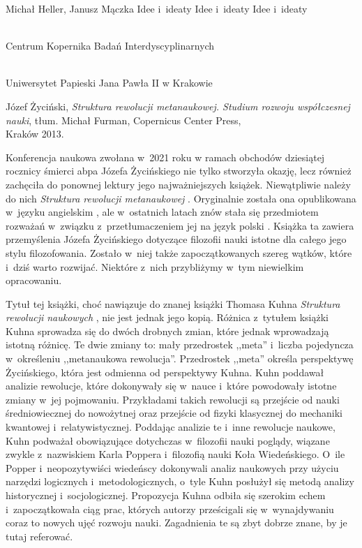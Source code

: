 \begin{newrevplenv2auth}{Michał Heller, Janusz Mączka}
	{Idee i~ideaty}
	{Idee i~ideaty}
	{Idee i~ideaty}
	{\flushright{}\\\subsubsectit\small{Centrum Kopernika Badań Interdyscyplinarnych}\par
	\flushright{}\\\subsubsectit\small{Uniwersytet Papieski Jana Pawła II w Krakowie}\par}
	{Józef Życiński, \textit{Struktura rewolucji metanaukowej. Studium rozwoju współczesnej nauki}, tłum. Michał Furman, Copernicus Center Press,
	\\Kraków 2013.}




\lettrine[loversize=0.13,lines=2,lraise=-0.01,nindent=0em,findent=0.2pt]%
{K}{}onferencja naukowa zwołana w~2021 roku w ramach obchodów dziesiątej rocznicy śmierci abpa Józefa Życińskiego nie tylko stworzyła okazję, lecz również zachęciła do ponownej lektury jego najważniejszych książek. Niewątpliwie należy do nich \textit{Struktura rewolucji metanaukowej}
\parencite[][]{zycinski_struktura_2013}. %
 Oryginalnie została ona opublikowana w~języku angielskim 
\parencite[][]{zycinski_structure_1988}, %
 ale w~ostatnich latach znów stała się przedmiotem rozważań w~związku z~przetłumaczeniem jej na język polski 
\parencites[zob. np.][]{liana_nauka_2019}{liana_jozefa_2020}. %
 Książka ta zawiera przemyślenia Józefa Życińskiego dotyczące filozofii nauki istotne dla całego jego stylu filozofowania. Zostało w~niej także zapoczątkowanych szereg wątków, które i~dziś warto rozwijać. Niektóre z~nich przybliżymy w~tym niewielkim opracowaniu.

Tytuł tej książki, choć nawiązuje do znanej książki Thomasa Kuhna \textit{Struktura rewolucji naukowych}
\parencite[][]{kuhn_struktura_1968}, %
 nie jest jednak jego kopią. Różnica z~tytułem książki Kuhna sprowadza się do dwóch drobnych zmian, które jednak wprowadzają istotną różnicę. Te dwie zmiany to: mały przedrostek ,,meta'' i~liczba pojedyncza w~określeniu ,,metanaukowa rewolucja''. Przedrostek ,,meta'' określa perspektywę Życińskiego, która jest odmienna od perspektywy Kuhna. Kuhn poddawał analizie rewolucje, które dokonywały się w~nauce i~które powodowały istotne zmiany w~jej pojmowaniu. Przykładami takich rewolucji są przejście od nauki średniowiecznej do nowożytnej oraz przejście od fizyki klasycznej do mechaniki kwantowej i~relatywistycznej. Poddając analizie te i~inne rewolucje naukowe, Kuhn podważał obowiązujące dotychczas w~filozofii nauki poglądy, wiązane zwykle z~nazwiskiem Karla Poppera i~filozofią nauki Koła Wiedeńskiego. O~ile Popper i~neopozytywiści wiedeńscy dokonywali analiz naukowych przy użyciu narzędzi logicznych i~metodologicznych, o~tyle Kuhn posłużył się metodą analizy historycznej i~socjologicznej. Propozycja Kuhna odbiła się szerokim echem i~zapoczątkowała ciąg prac, których autorzy prześcigali się w~wynajdywaniu coraz to nowych ujęć rozwoju nauki. Zagadnienia te są zbyt dobrze znane, by je tutaj referować.


\end{newrevplenv2auth}
